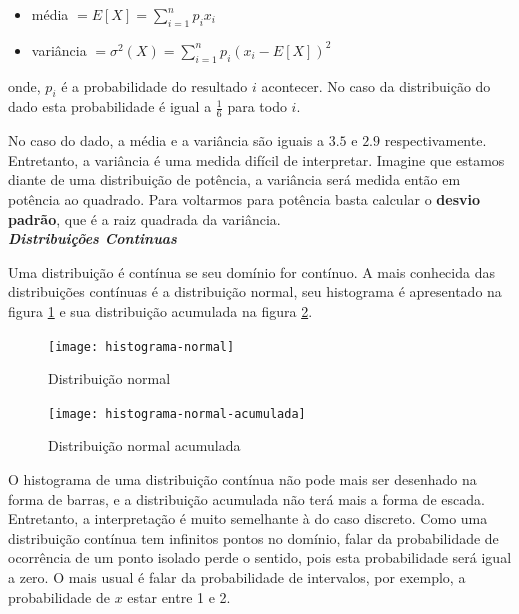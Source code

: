 \begin{itemize}
\item média $=E[X]=\sum_{i=1}^n p_i x_i$
\item variância $=\sigma^2(X)=\sum_{i=1}^n p_i (x_i-E[X])^2$
\end{itemize}

onde, $p_i$ é a probabilidade do resultado $i$ acontecer. No caso da distribuição do dado esta probabilidade é igual a $\frac{1}{6}$ para todo $i$.

No caso do dado, a média e a variância são iguais a $3.5$ e $2.9$ respectivamente. Entretanto, a variância é uma medida difícil de interpretar. Imagine que estamos diante de uma distribuição de potência, a variância será medida então em potência ao quadrado. Para voltarmos para potência basta calcular o \textbf{desvio padrão}, que é a raiz quadrada da variância.\\



\textbf{\textit{Distribuições Continuas}}

Uma distribuição é contínua se seu domínio for contínuo. A mais conhecida das distribuições contínuas é a distribuição normal, seu histograma é apresentado na figura \ref{fig:prob3} e sua distribuição acumulada na figura \ref{fig:prob4}. 


\begin{figure}[H]
\begin{centering}
\texttt{[image: histograma-normal]}\protect\caption{\label{fig:prob3}Distribuição normal}
\end{centering}
\end{figure}

\begin{figure}[H]
\begin{centering}
\texttt{[image: histograma-normal-acumulada]}\protect\caption{\label{fig:prob4}Distribuição normal acumulada}
\end{centering}
\end{figure}

O histograma de uma distribuição contínua não pode mais ser desenhado na forma de barras, e a distribuição acumulada não terá mais a forma de escada. Entretanto, a interpretação é muito semelhante à do caso discreto. Como uma distribuição contínua tem infinitos pontos no domínio, falar da probabilidade de ocorrência de um ponto isolado perde o sentido, pois esta probabilidade será igual a zero. O mais usual é falar da probabilidade de intervalos, por exemplo, a probabilidade de $x$ estar entre 1 e 2. 

